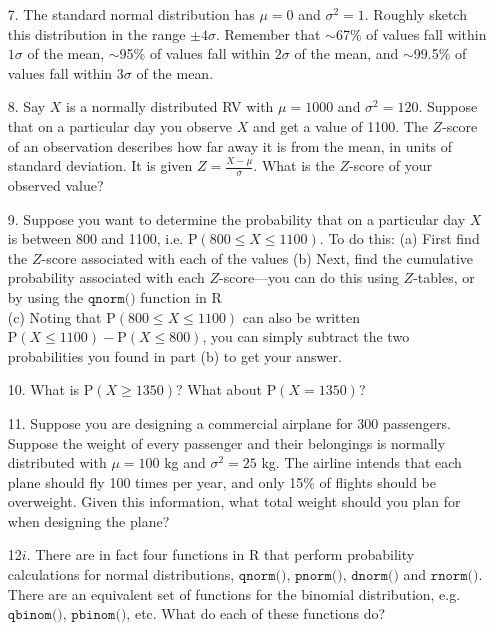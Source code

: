 \documentclass[10pt]{extarticle}
\renewcommand{\P}{\text{P}}
\begin{document}
\begin{itemize}

	\item[7.] The standard normal distribution has $\mu = 0$ and $\sigma^2 = 1$. Roughly sketch this distribution in the range $\pm 4\sigma$. Remember that $\sim$67\% of values fall within $1\sigma$ of the mean, $\sim$95\% of values fall within $2\sigma$ of the mean, and $\sim$99.5\% of values fall within $3\sigma$ of the mean. \\ 

	\item[8.] Say $X$ is a normally distributed RV with $\mu = 1000$ and $\sigma^2 = 120$. Suppose that on a particular day you observe $X$ and get a value of 1100. The $Z$-score of an observation describes how far away it is from the mean, in units of standard deviation. It is given $Z = \frac{X - \mu}{\sigma}$. What is the $Z$-score of your observed value? \\  

	\item[9.] Suppose you want to determine the probability that on a particular day $X$ is between 800 and 1100, i.e. $\P(800 \leq X \leq 1100)$. To do this: (a) First find the $Z$-score associated with each of the values (b) Next, find the cumulative probability associated with each $Z$-score---you can do this using $Z$-tables, or by using the $\texttt{qnorm()}$ function in R \\ 
(c) Noting that $\P(800 \leq X \leq 1100)$ can also be written $\P(X \leq 1100) - \P(X \leq 800)$, you can simply subtract the two probabilities you found in part (b) to get your answer. \\  

	\item[10.] What is $\P(X \geq 1350)$? What about $\P(X = 1350)$? \\ 

	\item[11.] Suppose you are designing a commercial airplane for 300 passengers. Suppose the weight of every passenger and their belongings is normally distributed with $\mu = 100$ kg and $\sigma^2 = 25$ kg. The airline intends that each plane should fly 100 times per year, and only 15\% of flights should be overweight. Given this information, what total weight should you plan for when designing the plane? \\  

	\item[12$i$.] There are in fact four functions in R that perform probability calculations for normal distributions, $\texttt{qnorm()}$, $\texttt{pnorm()}$, $\texttt{dnorm()}$ and $\texttt{rnorm()}$. There are an equivalent set of functions for the binomial distribution, e.g. $\texttt{qbinom()}$, $\texttt{pbinom()}$, etc. What do each of these functions do? 

\end{itemize}
\end{document}
